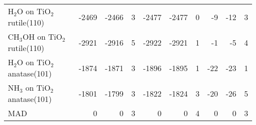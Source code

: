 \begin{table}
\begin{adjustbox}{center,max width=1\textwidth}
\begin{tabular}{lrrrrrrrrr}
H$_2$O on TiO$_2$ rutile(110) & -2469 & -2466 & 3 & -2477 & -2477 & 0 & -9 & -12 & 3 \\
CH$_3$OH on TiO$_2$ rutile(110) & -2921 & -2916 & 5 & -2922 & -2921 & 1 & -1 & -5 & 4 \\
H$_2$O on TiO$_2$ anatase(101) & -1874 & -1871 & 3 & -1896 & -1895 & 1 & -22 & -23 & 1 \\
NH$_3$ on TiO$_2$ anatase(101) & -1801 & -1799 & 3 & -1822 & -1824 & 3 & -20 & -26 & 5 \\
MAD & 0 & 0 & 3 & 0 & 0 & 4 & 0 & 0 & 3 \\
\bottomrule
\end{tabular}
\end{adjustbox}
\end{table}